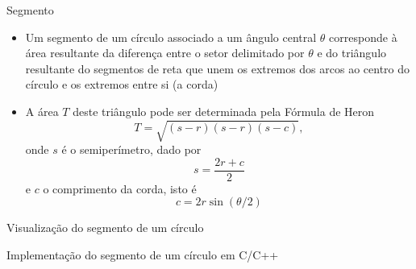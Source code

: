 \begin{frame}[fragile]{Segmento}

    \begin{itemize}
        \item Um segmento de um círculo associado a um ângulo central $\theta$ corresponde à área 
            resultante da diferença entre o setor delimitado por $\theta$ e do triângulo 
            resultante do segmentos de reta que unem os extremos dos arcos ao centro do círculo e 
            os extremos entre si (a corda)
        \pause

        \item A área $T$ deste triângulo pode ser determinada pela Fórmula de Heron
        \[
            T = \sqrt{(s - r)(s - r)(s - c)},
        \] onde $s$ é o semiperímetro, dado por
        \[
            s = \frac{2r + c}{2}
        \] e $c$ o comprimento da corda, isto é
        \[
            c = 2r\sin(\theta/2)
        \]
    \end{itemize}

\end{frame}

\begin{frame}[fragile]{Visualização do segmento de um círculo}

    \begin{figure}
        \centering
    \end{figure}

\end{frame}

\begin{frame}[fragile]{Implementação do segmento de um círculo em C/C++}
\end{frame}
